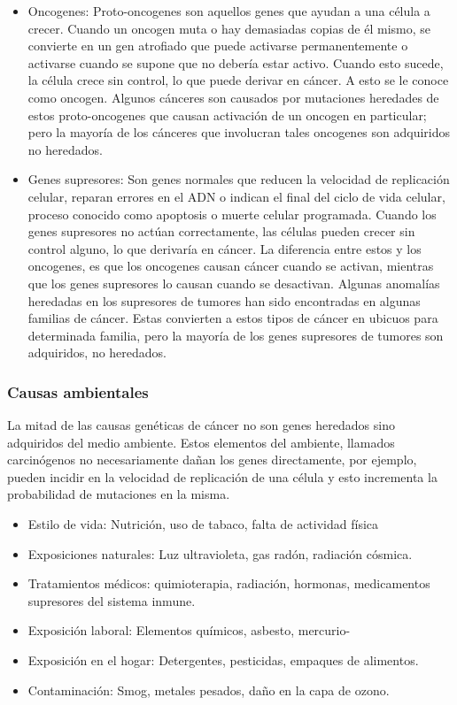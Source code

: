 \begin{itemize}
    \item{Oncogenes}: Proto-oncogenes son aquellos genes que ayudan a una célula
    a crecer. Cuando un oncogen muta o hay demasiadas copias de él mismo, se
    convierte en un gen atrofiado que puede activarse permanentemente o
    activarse cuando se supone que no debería estar activo. Cuando esto sucede,
    la célula crece sin control, lo que puede derivar en cáncer. A esto se le
    conoce como oncogen. Algunos cánceres son causados por mutaciones heredades
    de estos proto-oncogenes que causan activación de un oncogen en particular;
    pero la mayoría de los cánceres que involucran tales oncogenes son
    adquiridos no heredados.
    \item{Genes supresores}: Son genes normales que reducen la velocidad de
    replicación celular, reparan errores en el ADN o indican el final del ciclo
    de vida celular, proceso conocido como apoptosis o muerte celular
    programada. Cuando los genes supresores no actúan correctamente, las células
    pueden crecer sin control alguno, lo que derivaría en cáncer. La diferencia
    entre estos y los oncogenes, es que los oncogenes causan cáncer cuando se
    activan, mientras que los genes supresores lo causan cuando se desactivan.
    Algunas anomalías heredadas en los supresores de tumores han sido
    encontradas en algunas familias de cáncer. Estas convierten a estos tipos de
    cáncer en ubicuos para determinada familia, pero la mayoría de los genes
    supresores de tumores son adquiridos, no heredados.
\end{itemize}

\subsubsection{Causas ambientales}

La mitad de las causas genéticas de cáncer no son
genes heredados sino adquiridos del medio ambiente. Estos elementos del
ambiente, llamados carcinógenos no necesariamente dañan los genes directamente,
por ejemplo, pueden incidir en la velocidad de replicación de una célula y esto
incrementa la probabilidad de mutaciones en la misma.

\begin{itemize}
    \item{Estilo de vida}: Nutrición, uso de tabaco, falta de actividad física
    \item{Exposiciones naturales}: Luz ultravioleta, gas radón, radiación
    cósmica.
    \item{Tratamientos médicos}: quimioterapia, radiación, hormonas,
    medicamentos supresores del sistema inmune.
    \item{Exposición laboral}: Elementos químicos, asbesto, mercurio-
    \item{Exposición en el hogar}: Detergentes, pesticidas, empaques de
    alimentos.
    \item{Contaminación}: Smog, metales pesados, daño en la capa de ozono.     
\end{itemize}

